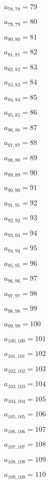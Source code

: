 \documentclass[a4paper,12pt]{article}
\begin{document}
$a _{ 78, 78 } = 79$

$a _{ 79, 79 } = 80$

$a _{ 80, 80 } = 81$

$a _{ 81, 81 } = 82$

$a _{ 82, 82 } = 83$

$a _{ 83, 83 } = 84$

$a _{ 84, 84 } = 85$

$a _{ 85, 85 } = 86$

$a _{ 86, 86 } = 87$

$a _{ 87, 87 } = 88$

$a _{ 88, 88 } = 89$

$a _{ 89, 89 } = 90$

$a _{ 90, 90 } = 91$

$a _{ 91, 91 } = 92$

$a _{ 92, 92 } = 93$

$a _{ 93, 93 } = 94$

$a _{ 94, 94 } = 95$

$a _{ 95, 95 } = 96$

$a _{ 96, 96 } = 97$

$a _{ 97, 97 } = 98$

$a _{ 98, 98 } = 99$

$a _{ 99, 99 } = 100$

$a _{ 100, 100 } = 101$

$a _{ 101, 101 } = 102$

$a _{ 102, 102 } = 103$

$a _{ 103, 103 } = 104$

$a _{ 104, 104 } = 105$

$a _{ 105, 105 } = 106$

$a _{ 106, 106 } = 107$

$a _{ 107, 107 } = 108$

$a _{ 108, 108 } = 109$

$a _{ 109, 109 } = 110$
\end{document}
